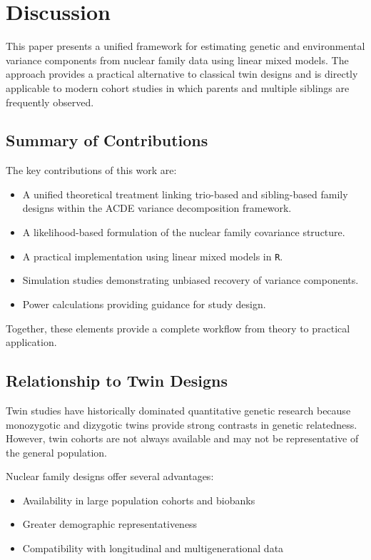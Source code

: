 \section{Discussion}

This paper presents a unified framework for estimating genetic and
environmental variance components from nuclear family data using linear
mixed models. The approach provides a practical alternative to classical
twin designs and is directly applicable to modern cohort studies in which
parents and multiple siblings are frequently observed.

\subsection{Summary of Contributions}

The key contributions of this work are:

\begin{itemize}
\item A unified theoretical treatment linking trio-based and sibling-based
family designs within the ACDE variance decomposition framework.
\item A likelihood-based formulation of the nuclear family covariance
structure.
\item A practical implementation using linear mixed models in \texttt{R}.
\item Simulation studies demonstrating unbiased recovery of variance
components.
\item Power calculations providing guidance for study design.
\end{itemize}

Together, these elements provide a complete workflow from theory to
practical application.

\subsection{Relationship to Twin Designs}

Twin studies have historically dominated quantitative genetic research
because monozygotic and dizygotic twins provide strong contrasts in
genetic relatedness. However, twin cohorts are not always available and
may not be representative of the general population.

Nuclear family designs offer several advantages:

\begin{itemize}
\item Availability in large population cohorts and biobanks
\item Greater demographic representativeness
\item Compatibility with longitudinal and multigenerational data
\end{itemize}

